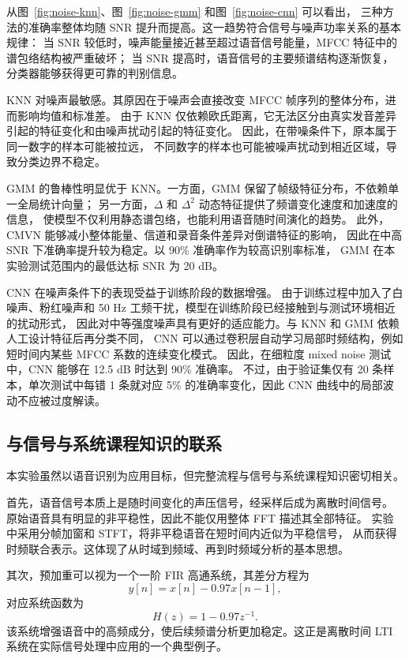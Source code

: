 从图~\ref{fig:noise-knn}、图~\ref{fig:noise-gmm} 和图~\ref{fig:noise-cnn} 可以看出，
三种方法的准确率整体均随 SNR 提升而提高。这一趋势符合信号与噪声功率关系的基本规律：
当 SNR 较低时，噪声能量接近甚至超过语音信号能量，MFCC 特征中的谱包络结构被严重破坏；
当 SNR 提高时，语音信号的主要频谱结构逐渐恢复，分类器能够获得更可靠的判别信息。

KNN 对噪声最敏感。其原因在于噪声会直接改变 MFCC 帧序列的整体分布，进而影响均值和标准差。
由于 KNN 仅依赖欧氏距离，它无法区分由真实发音差异引起的特征变化和由噪声扰动引起的特征变化。
因此，在带噪条件下，原本属于同一数字的样本可能被拉远，
不同数字的样本也可能被噪声扰动到相近区域，导致分类边界不稳定。

GMM 的鲁棒性明显优于 KNN。一方面，GMM 保留了帧级特征分布，不依赖单一全局统计向量；
另一方面，$\Delta$ 和 $\Delta^2$ 动态特征提供了频谱变化速度和加速度的信息，
使模型不仅利用静态谱包络，也能利用语音随时间演化的趋势。
此外，CMVN 能够减小整体能量、信道和录音条件差异对倒谱特征的影响，
因此在中高 SNR 下准确率提升较为稳定。以 90\% 准确率作为较高识别率标准，
GMM 在本实验测试范围内的最低达标 SNR 为 20 dB。

CNN 在噪声条件下的表现受益于训练阶段的数据增强。
由于训练过程中加入了白噪声、粉红噪声和 50 Hz 工频干扰，模型在训练阶段已经接触到与测试环境相近的扰动形式，
因此对中等强度噪声具有更好的适应能力。与 KNN 和 GMM 依赖人工设计特征后再分类不同，
CNN 可以通过卷积层自动学习局部时频结构，例如短时间内某些 MFCC 系数的连续变化模式。
因此，在细粒度 mixed noise 测试中，CNN 能够在 12.5 dB 时达到 90\% 准确率。
不过，由于验证集仅有 20 条样本，单次测试中每错 1 条就对应 5\% 的准确率变化，因此 CNN 曲线中的局部波动不应被过度解读。

\subsection{与信号与系统课程知识的联系}

本实验虽然以语音识别为应用目标，但完整流程与信号与系统课程知识密切相关。

首先，语音信号本质上是随时间变化的声压信号，经采样后成为离散时间信号。
原始语音具有明显的非平稳性，因此不能仅用整体 FFT 描述其全部特征。
实验中采用分帧加窗和 STFT，将非平稳语音在短时间内近似为平稳信号，
从而获得时频联合表示。这体现了从时域到频域、再到时频域分析的基本思想。

其次，预加重可以视为一个一阶 FIR 高通系统，其差分方程为
\begin{equation}
  y[n]=x[n]-0.97x[n-1],
\end{equation}
对应系统函数为
\begin{equation}
  H(z)=1-0.97z^{-1}.
\end{equation}
该系统增强语音中的高频成分，使后续频谱分析更加稳定。这正是离散时间 LTI 系统在实际信号处理中应用的一个典型例子。

